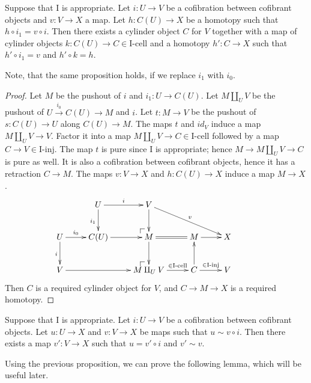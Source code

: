 \documentclass{amsart}
\makeatletter
\theoremstyle{definition}
\newcommand{\I}{\mathrm{I}}
\newcommand{\class}[2]{#1\text{-}\mathrm{#2}}
\newcommand{\Iinj}[1][\I]{\class{#1}{inj}}
\newcommand{\Icell}[1][\I]{\class{#1}{cell}}
\newcommand{\cyli}{i}
\newcommand{\po}[1][dr]{\save*!/#1+1.2pc/#1:(1,-1)@^{|-}\restore}
\makeatother
\begin{document}
\begin{prop}
Suppose that $\I$ is appropriate.
Let $i : U \to V$ be a cofibration between cofibrant objects and $v : V \to X$ a map.
Let $h : C(U) \to X$ be a homotopy such that $h \circ \cyli_1 = v \circ i$.
Then there exists a cylinder object $C$ for $V$ together with a map of cylinder objects
$k : C(U) \to C \in \Icell$ and a homotopy $h' : C \to X$ such that $h' \circ \cyli_1 = v$ and $h' \circ k = h$.
\end{prop}
Note, that the same proposition holds, if we replace $\cyli_1$ with $\cyli_0$.
\begin{proof}
Let $M$ be the pushout of $i$ and $\cyli_1 : U \to C(U)$.
Let $M \amalg_U V$ be the pushout of $U \overset{\cyli_0}\to C(U) \to M$ and $i$.
Let $t : M \to V$ be the pushout of $s : C(U) \to U$ along $C(U) \to M$.
The maps $t$ and $id_V$ induce a map $M \amalg_U V \to V$.
Factor it into a map $M \amalg_U V \to C \in \Icell$ followed by a map $C \to V \in \Iinj$.
The map $t$ is pure since $\I$ is appropriate; hence $M \to M \amalg_U V \to C$ is pure as well.
It is also a cofibration between cofibrant objects, hence it has a retraction $C \to M$.
The maps $v : V \to X$ and $h : C(U) \to X$ induce a map $M \to X$.
\[ \xymatrix{                              & U \ar[r]^i \ar[d]_{\cyli_1} & V \ar[d] \ar[drr]^v     &          &         & \\
              U \ar[r]^-{\cyli_0} \ar[d]_i & C(U) \ar[r]                 & \po M \ar[d] \ar@{=}[r] & M \ar[r] & X       & \\
              V \ar[rr]                    &      & \po M \amalg_U V \ar[r]^-{\in \Icell} & C \ar[r]^{\in \Iinj} \ar[u] & V
            } \]
Then $C$ is a required cylinder object for $V$, and $C \to M \to X$ is a required homotopy.
\end{proof}

\begin{cor}
Suppose that $\I$ is appropriate.
Let $i : U \to V$ be a cofibration between cofibrant objects.
Let $u : U \to X$ and $v : V \to X$ be maps such that $u \sim v \circ i$.
Then there exists a map $v' : V \to X$ such that $u = v' \circ i$ and $v' \sim v$.
\end{cor}

Using the previous proposition, we can prove the following lemma, which will be useful later.
\end{document}
